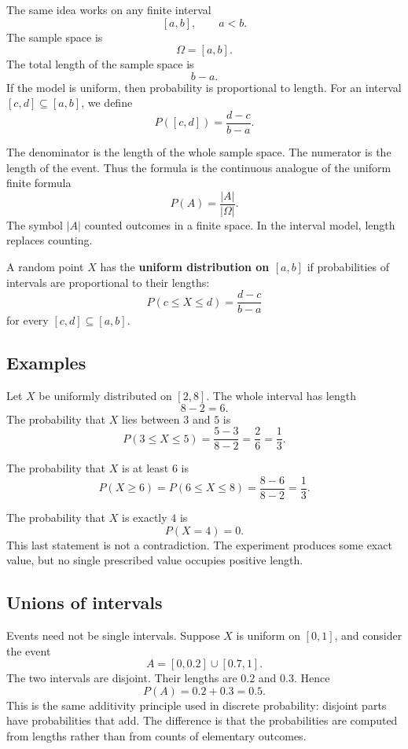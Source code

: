The same idea works on any finite interval
\[
[a,b],\qquad a<b.
\]
The sample space is
\[
\Omega=[a,b].
\]
The total length of the sample space is
\[
b-a.
\]
If the model is uniform, then probability is proportional to length. For an
interval \([c,d]\subseteq[a,b]\), we define
\[
P([c,d])=\frac{d-c}{b-a}.
\]

The denominator is the length of the whole sample space. The numerator is the
length of the event. Thus the formula is the continuous analogue of the uniform
finite formula
\[
P(A)=\frac{|A|}{|\Omega|}.
\]
The symbol \(|A|\) counted outcomes in a finite space. In the interval model,
length replaces counting.

\begin{definitionbox}
A random point \(X\) has the \textbf{uniform distribution on \([a,b]\)} if
probabilities of intervals are proportional to their lengths:
\[
P(c\leq X\leq d)=\frac{d-c}{b-a}
\]
for every \([c,d]\subseteq[a,b]\).
\end{definitionbox}

\subsection*{Examples}

Let \(X\) be uniformly distributed on \([2,8]\). The whole interval has length
\[
8-2=6.
\]
The probability that \(X\) lies between \(3\) and \(5\) is
\[
P(3\leq X\leq 5)=\frac{5-3}{8-2}=\frac{2}{6}=\frac13.
\]

The probability that \(X\) is at least \(6\) is
\[
P(X\geq 6)=P(6\leq X\leq 8)=\frac{8-6}{8-2}=\frac13.
\]

The probability that \(X\) is exactly \(4\) is
\[
P(X=4)=0.
\]
This last statement is not a contradiction. The experiment produces some exact
value, but no single prescribed value occupies positive length.

\subsection*{Unions of intervals}

Events need not be single intervals. Suppose \(X\) is uniform on \([0,1]\), and
consider the event
\[
A=[0,0.2]\cup[0.7,1].
\]
The two intervals are disjoint. Their lengths are \(0.2\) and \(0.3\). Hence
\[
P(A)=0.2+0.3=0.5.
\]
This is the same additivity principle used in discrete probability: disjoint
parts have probabilities that add. The difference is that the probabilities are
computed from lengths rather than from counts of elementary outcomes.

